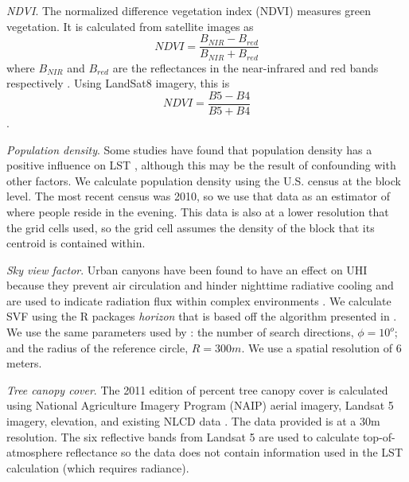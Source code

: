 \documentclass[final,3p,times,twocolumn,sort&compress]{elsarticle}
\begin{document}
\textit{NDVI}. 
The normalized difference vegetation index (NDVI) measures green vegetation. 
It is calculated from satellite images as $$NDVI=\frac{B_{NIR}-B_{red}}{B_{NIR}+B_{red}}$$ where $B_{NIR}$ and $B_{red}$ are the reflectances in the near-infrared and red bands respectively \cite{Alhawiti2016-wv}. 
Using LandSat8 imagery, this is $$NDVI=\frac{B5-B4}{B5+B4}$$ \cite{barsi2014}.


\textit{Population density}. 
Some studies have found that population density has a positive influence on LST \cite{Li2017-yl, Peng2018-cp}, although this may be the result of confounding with other factors. 
We calculate population density using the U.S. census at the block level. 
The most recent census was 2010, so we use that data as an estimator of where people reside in the evening. 
This data is also at a lower resolution that the grid cells used, so the grid cell assumes the density of the block that its centroid is contained within.

\textit{Sky view factor}. Urban canyons have been found to have an effect on UHI because they prevent air circulation and hinder nighttime radiative cooling \cite{Landsberg1981-mq, Chun2017-mm} and are used to indicate radiation flux within complex environments \cite{Matzarakis2007-xy}. We calculate SVF using the R packages \textit{horizon} \cite{Van_doninck2018-ib} that is based off the algorithm presented in \cite{Dozier1990-kn}. 
We use the same parameters used by \cite{Chun2017-mm}: the number of search directions, $\phi=10^o$; and the radius of the reference circle, $R=300m$. 
We use a spatial resolution of 6 meters.

\textit{Tree canopy cover}. 
The 2011 edition of percent tree canopy cover is calculated using National Agriculture Imagery Program (NAIP) aerial imagery, Landsat 5 imagery, elevation, and existing NLCD data \cite{Coulston2012-uu, Homer2015-ce}. 
The data provided is at a 30m resolution. 
The six reflective bands from Landsat 5 are used to calculate top-of-atmosphere reflectance \cite{Coulston2012-uu} so the data does not contain information used in the LST calculation (which requires radiance). 
\end{document}

